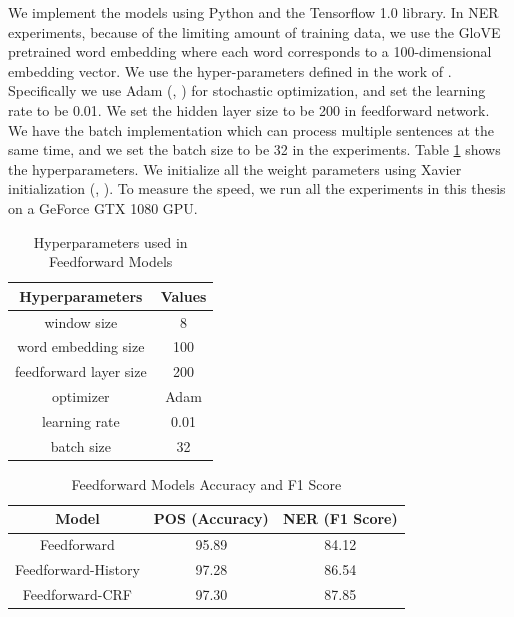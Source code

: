 We implement the models using Python and the Tensorflow 1.0 library. In NER experiments, because of the limiting amount of training data, we use the GloVE pretrained word embedding where each word corresponds to a 100-dimensional embedding vector. We use the  hyper-parameters defined in the work of \cite{chen2014fast}. Specifically we use Adam (\citeauthor{kingma2014adam}, \citeyear{kingma2014adam}) for stochastic optimization, and set the learning rate to be 0.01. We set the hidden layer size to be 200 in feedforward network. We have the batch implementation which can process multiple sentences at the same time, and we set the batch size to be 32 in the experiments. Table \ref{table:hyperparameters1} shows the hyperparameters. We initialize all the weight parameters using Xavier initialization (\citeauthor{glorot2011domain}, \citeyear{glorot2011domain}). To measure the speed, we run all the experiments in this thesis on a GeForce GTX 1080 GPU.

\begin{table}[]
\centering
\caption{Hyperparameters used in Feedforward Models}
\label{table:hyperparameters1}
\begin{tabular}{|c|c|}
\hline
Hyperparameters & Values \\ \hline
window size   & 8 \\ \hline
word embedding size & 100 \\ \hline
feedforward layer size & 200 \\ \hline
optimizer & Adam \\ \hline
learning rate & 0.01 \\ \hline
batch size & 32 \\ \hline
\end{tabular}
\end{table}

\begin{table}[]
\centering
\caption{Feedforward Models Accuracy and F1 Score}
\label{table:ff-table1}
\begin{tabular}{|c|c|c|}
\hline
Model         & POS (Accuracy)  & NER (F1 Score)       \\ \hline
Feedforward    & 95.89          &   84.12     \\ \hline
Feedforward-History & 97.28     & 86.54        \\ \hline
Feedforward-CRF     & 97.30          &   87.85     \\ \hline
\end{tabular}
\end{table}

